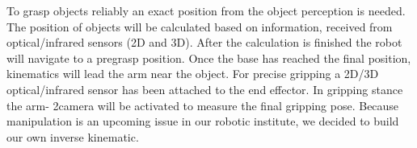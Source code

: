 To grasp objects reliably an exact position from the object perception is needed. The position of
objects will be calculated based on information, received from optical/infrared sensors (2D and 3D).
After the calculation is finished the robot will navigate to a pregrasp position. Once the base has
reached the final position, kinematics will lead the arm near the object. For precise gripping a
2D/3D optical/infrared sensor has been attached to the end effector. In gripping stance the arm-
2camera will be activated to measure the final gripping pose. Because manipulation is an upcoming
issue in our robotic institute, we decided to build our own inverse kinematic.